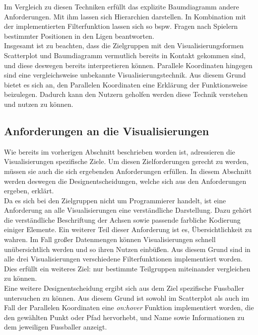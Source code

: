 \documentclass[usegeometry=true]{scrartcl}
\begin{document}
Im Vergleich zu diesen Techniken erfüllt das explizite Baumdiagramm andere Anforderungen. Mit ihm lassen sich Hierarchien darstellen. In Kombination mit der implementierten Filterfunktion lassen sich so bspw. Fragen nach Spielern bestimmter Positionen in den Ligen beantworten.\\
Insgesamt ist zu beachten, dass die Zielgruppen mit den Visualisierungsformen Scatterplot und Baumdiagramm vermutlich bereits in Kontakt gekommen sind, und diese deswegen bereits interpretieren können. Parallele Koordinaten hingegen sind eine vergleichsweise unbekannte Visualisierungstechnik. Aus diesem Grund bietet es sich an, den Parallelen Koordinaten eine Erklärung der Funktionsweise beizulegen. Dadurch kann den Nutzern geholfen werden diese Technik verstehen und nutzen zu können.

\subsection{Anforderungen an die Visualisierungen}
Wie bereits im vorherigen Abschnitt beschrieben worden ist, adressieren die Visualisierungen spezifische Ziele. Um diesen Zielforderungen gerecht zu werden, müssen sie auch die sich ergebenden Anforderungen erfüllen. In diesem Abschnitt werden deswegen die Designentscheidungen, welche sich aus den Anforderungen ergeben, erklärt.\\
Da es sich bei den Zielgruppen nicht um Programmierer handelt, ist eine Anforderung an alle Visualisierungen eine verständliche Darstellung. Dazu gehört die verständliche Beschriftung der Achsen sowie passende farbliche Kodierung einiger Elemente. Ein weiterer Teil dieser Anforderung ist es, Übersichtlichkeit zu wahren. Im Fall großer Datenmengen können Visualisierungen schnell unübersichtlich werden und so ihren Nutzen einbüßen. Aus diesem Grund sind in alle drei Visualisierungen verschiedene Filterfunktionen implementiert worden. Dies erfüllt ein weiteres Ziel: nur bestimmte Teilgruppen miteinander vergleichen zu können.\\
Eine weitere Designentscheidung ergibt sich aus dem Ziel spezifische Fussballer untersuchen zu können. Aus diesem Grund ist sowohl im Scatterplot als auch im Fall der Parallelen Koordinaten eine \textit{on:hover} Funktion implementiert worden, die den gewählten Punkt oder Pfad hervorhebt, und Name sowie Informationen zu dem jeweiligen Fussballer anzeigt.\\
\end{document}
